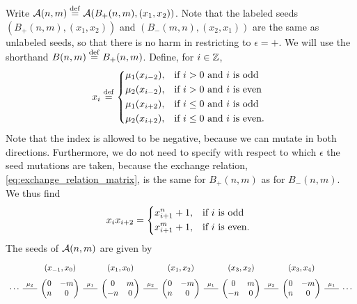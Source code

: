 \begin{example}
	Write $\mathcal{A}(n,m) \overset{\mathrm{def}}{=} \mathcal{A}(B_{+}(n,m), (x_1, x_2))$. Note that the labeled seeds
	$(B_{+}(n,m), (x_1, x_2))$ and $(B_{-}(m, n), (x_2, x_1))$ are the same as unlabeled
	seeds, so that there is no harm in restricting to $\epsilon = +$. We will use the
	shorthand $B(n,m) \overset{\mathrm{def}}{=} B_{+}(n,m)$. Define, for $i \in \mathbb{Z}$,
	\begin{equation*}
		x_i \defeq  \begin{dcases*}
			\mu_1 (x_{i-2}), & if $i > 0$ and $i$ is odd      \\
			\mu_2 (x_{i-2}), & if $i > 0$ and $i$ is even     \\
			\mu_1 (x_{i+2}), & if $i \leq 0$ and $i$ is odd   \\
			\mu_2 (x_{i+2}), & if $i \leq 0$ and $i$ is even.
		\end{dcases*}
	\end{equation*}
	Note that the index is allowed to be negative, because we can mutate in both
	directions. Furthermore, we do not need to specify with respect to which $\epsilon$ the
	seed mutations are taken, because the exchange relation,
	\cref{eq:exchange_relation_matrix}, is the same for $B_{+}(n,m)$ as for $B_{-}(n,m)$.
	We thus find
	\begin{equation}\label{eq:recurrence_rank2}
		x_i x_{i+2} = \begin{dcases*}
			x_{i+1}^n + 1, & if $i$ is odd   \\
			x_{i+1}^m + 1, & if $i$ is even.
		\end{dcases*}
	\end{equation}
	The seeds of $\mathcal{A}(n,m)$ are given by
	\begin{equation*}
		\begin{tikzcd}[sep=scriptsize, row sep= 0.1em, ampersand replacement=\&]
			\& (x_{-1}, x_0) \& (x_{1}, x_0) \& (x_1, x_2) \& (x_3, x_2) \& (x_3, x_4)\\
			\cdots \rar[dash, "\mu_2"] \&\begin{pmatrix}
				0 & -m \\
				n & 0
			\end{pmatrix}
			\rar[dash, "\mu_1"] \&\begin{pmatrix}
				0  & m \\
				-n & 0
			\end{pmatrix}
			\rar[dash, "\mu_2"] \&\begin{pmatrix}
				0 & -m \\
				n & 0
			\end{pmatrix}
			\rar[dash, "\mu_1"] \&\begin{pmatrix}
				0  & m \\
				-n & 0
			\end{pmatrix}
			\rar[dash, "\mu_2"] \&\begin{pmatrix}
				0 & -m \\
				n & 0
			\end{pmatrix}
			\rar[dash, "\mu_1"] \& \cdots
		\end{tikzcd}
	\end{equation*}


\end{example}
